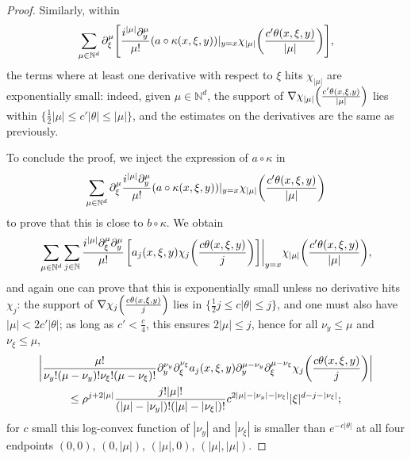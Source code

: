 \documentclass[10pt]{amsart}
\theoremstyle{definition}\newtheorem{defi}[theo]{Definition}\newtheorem{rema}[theo]{Remark}\newtheorem{exam}[theo]{Example}\newtheorem{exem}[theo]{Example}\newtheorem{nota}[theo]{Notation}
\newcommand\1{\mathds{1}}
\newcommand{\N}{\mathbb{N}}
\let\originalleft\left
\let\originalright\right
\renewcommand{\left}{\mathopen{}\mathclose\bgroup\originalleft}
\renewcommand{\right}{\aftergroup\egroup\originalright}
\begin{document}
\begin{proof}
Similarly, within
\[
\sum_{\mu\in
\N^d}\partial_{\xi}^{\mu}\left[\frac{i^{|\mu|}\partial_y^{\mu}}{\mu!}(a\circ
\kappa(x,\xi,y))|_{y=x}\chi_{|\mu|}\left(\frac{c'\theta(x,\xi,y)}{|\mu|}\right)\right],
\]
the terms where at least one derivative with respect to $\xi$ hits $\chi_{|\mu|}$ are exponentially small: indeed, given $\mu\in \N^d$, the support of $\nabla
\chi_{|\mu|}\left(\frac{c'\theta(x,\xi,y)}{|\mu|}\right)$ lies within $\{\frac 12 |\mu|\leq c'|\theta|\leq |\mu|\}$, and the estimates on the derivatives are the same as previously.

To conclude the proof, we inject the expression of $a\circ \kappa$ in
\[
\sum_{\mu\in
\N^d}\partial_{\xi}^{\mu}\frac{i^{|\mu|}\partial_y^{\mu}}{\mu!}(a\circ
\kappa(x,\xi,y))|_{y=x}\chi_{|\mu|}\left(\frac{c'\theta(x,\xi,y)}{|\mu|}\right)
\]
to prove that this is close to $b\circ \kappa$. We obtain
\[
\sum_{\mu\in \N^d}\sum_{j\in
\N}\frac{i^{|\mu|}\partial_{\xi}^{\mu}\partial_y^{\mu}}{\mu!}\left.\left[a_j(x,\xi,y)\chi_j\left(\frac{c\theta(x,\xi,y)}{j}\right)\right]\right|_{y=x}\chi_{|\mu|}\left(\frac{c'\theta(x,\xi,y)}{|\mu|}\right),
\]
and again one can prove that this is exponentially small unless no derivative hits~$\chi_j$: the support of $\nabla\chi_j\left(\frac{c\theta(x,\xi,y)}{j}\right)$ lies in $\{\frac 12 j\leq c|\theta|\leq j\}$, and one must also have $|\mu|<2c'|\theta|$; as long as $c'<\frac{c}{4}$, this ensures $2|\mu|\leq j$, hence for all $\nu_y\leq \mu$ and $\nu_{\xi}\leq \mu$,
\begin{multline*}
\left|\frac{\mu!}{\nu_y!(\mu-\nu_y)!\nu_{\xi}!(\mu-\nu_{\xi})!}\partial^{\nu_y}_y\partial^{\nu_{\xi}}_\xi a_j(x,\xi,y)\partial^{\mu-\nu_y}_y\partial^{\mu-\nu_{\xi}}_\xi\chi_j\left(\frac{c\theta(x,\xi,y)}{j}\right)\right|\\
\leq \rho^{j+2|\mu|}\frac{j!|\mu|!}{(|\mu|-|\nu_y|)!(|\mu|-|\nu_\xi|)!}c^{2|\mu|-|\nu_y|-|\nu_{\xi}|}|\xi|^{d-j-|\nu_{\xi}|};
\end{multline*}
for $c$ small this log-convex function of $|\nu_y|$ and $|\nu_{\xi}|$ is smaller than $e^{-c|\theta|}$ at all four endpoints $(0,0)$, $(0,|\mu|)$, $(|\mu|,0)$, $(|\mu|,|\mu|)$.


\end{proof}
\end{document}

